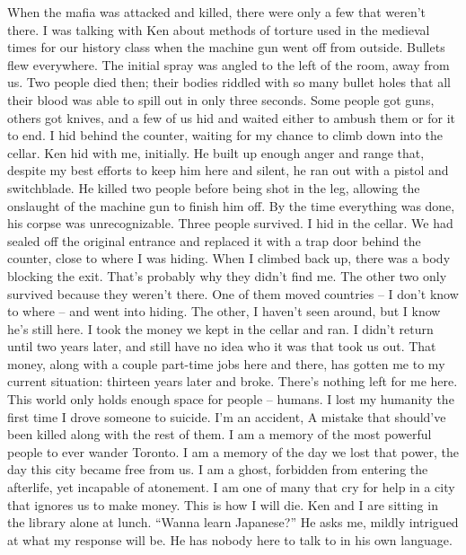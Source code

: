 \documentclass[a4paper, 12pt]{book}
\begin{document}
\newline
\tab
When the mafia was attacked and killed, there were only a few that weren’t there. I was talking with Ken about methods of torture used in the medieval times for our history class when the machine gun went off from outside. Bullets flew everywhere. The initial spray was angled to the left of the room, away from us. Two people died then; their bodies riddled with so many bullet holes that all their blood was able to spill out in only three seconds. Some people got guns, others got knives, and a few of us hid and waited either to ambush them or for it to end. I hid behind the counter, waiting for my chance to climb down into the cellar. Ken hid with me, initially. He built up enough anger and range that, despite my best efforts to keep him here and silent, he ran out with a pistol and switchblade. He killed two people before being shot in the leg, allowing the onslaught of the machine gun to finish him off. By the time everything was done, his corpse was unrecognizable. Three people survived. 
\newline
\tab
I hid in the cellar. We had sealed off the original entrance and replaced it with a trap door behind the counter, close to where I was hiding. When I climbed back up, there was a body blocking the exit. That’s probably why they didn’t find me. The other two only survived because they weren’t there. One of them moved countries -- I don’t know to where -- and went into hiding. The other, I haven’t seen around, but I know he’s still here. I took the money we kept in the cellar and ran. I didn’t return until two years later, and still have no idea who it was that took us out.
\newline
\tab
That money, along with a couple part-time jobs here and there, has gotten me to my current situation: thirteen years later and broke. There’s nothing left for me here. This world only holds enough space for people -- humans. I lost my humanity the first time I drove someone to suicide. I’m an accident, A mistake that should’ve been killed along with the rest of them. I am a memory of the most powerful people to ever wander Toronto. I am a memory of the day we lost that power, the day this city became free from us. I am a ghost, forbidden from entering the afterlife, yet incapable of atonement. I am one of many that cry for help in a city that ignores us to make money. This is how I will die.
\newline\newline\newline
\tab
Ken and I are sitting in the library alone at lunch. ``Wanna learn Japanese?'' He asks me, mildly intrigued at what my response will be. He has nobody here to talk to in his own language.
\end{document}
